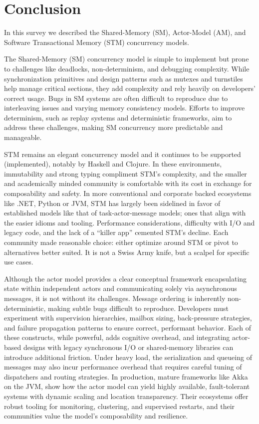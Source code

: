 \section{Conclusion\label{sec:conclusion}}
In this survey we described the Shared-Memory (SM),
Actor-Model (AM), and Software Transactional Memory (STM)
concurrency models.

The Shared-Memory (SM) concurrency model
is simple to implement but prone to challenges like deadlocks,
non-determinism, and debugging complexity.
While synchronization primitives and design patterns
such as mutexes and turnstiles help manage critical sections,
they add complexity and rely heavily on developers' correct usage.
Bugs in SM systems are often difficult to reproduce due to
interleaving issues and varying memory consistency models.
Efforts to improve determinism, such as replay systems and
deterministic frameworks, aim to address these challenges,
making SM concurrency more predictable and manageable.

STM remains an elegant concurrency model and it
continues to be supported (implemented), notably by Haskell and Clojure.
In these environments, immutability and strong typing compliment STM’s complexity,
and the smaller and academically minded community is comfortable with its cost
in exchange for composability and safety. In more conventional and corporate
backed ecosystems like .NET, Python or JVM, STM has largely been sidelined
in favor of established models like that of task-actor-message models;
ones that align with the easier idioms and tooling.
Performance considerations, difficulty with I/O and legacy code,
and the lack of a “killer app” cemented STM’s decline.
Each community made reasonable choice: either optimize
around STM or pivot to alternatives better suited.
It is not a Swiss Army knife, but a scalpel for specific use cases.

Although the actor model provides a clear conceptual framework encapsulating state 
within independent actors and communicating solely via asynchronous messages, 
it is not without its challenges. Message ordering is inherently 
non-deterministic, making subtle bugs difficult to reproduce. 
Developers must experiment with supervision hierarchies, 
mailbox sizing, back-pressure strategies, and failure propagation 
patterns to ensure correct, performant behavior. Each of these 
constructs, while powerful, adds cognitive overhead, and integrating 
actor-based designs with legacy synchronous I/O or shared-memory libraries 
can introduce additional friction. Under heavy load, the serialization and 
queueing of messages may also incur performance overhead that requires careful 
tuning of dispatchers and routing strategies. In production, mature frameworks 
like Akka on the JVM, show how the actor model can yield highly available, 
fault-tolerant systems with dynamic scaling and location transparency. Their 
ecosystems offer robust tooling for monitoring, clustering, and supervised 
restarts, and their communities value the model’s composability and resilience. 